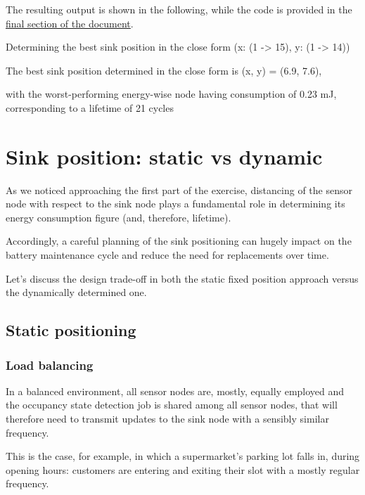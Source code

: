 \documentclass[a4paper,11pt]{article} %
\begin{document}
    The resulting output is shown in the following, while the code is provided in the \hyperref[subsec:lifetime-of-the-system-with-a-fixed-sink-position]{final section of the document}.

    \begin{tcolorbox}
        Determining the best sink position in the close form (x: (1 -> 15), y: (1 -> 14))

        \smallskip

        The best sink position determined in the close form is (x, y) = (6.9, 7.6),

        \smallskip

        with the worst-performing energy-wise node having consumption of 0.23 mJ, corresponding to a lifetime of 21 cycles
    \end{tcolorbox}


    \section{Sink position: static vs dynamic}\label{sec:sink-position:-static-vs-dynamic}

    As we noticed approaching the first part of the exercise, distancing of the sensor node with respect to the sink node plays a fundamental role in determining its energy consumption figure (and, therefore, lifetime).

    Accordingly, a careful planning of the sink positioning can hugely impact on the battery maintenance cycle and reduce the need for replacements over time.

    Let's discuss the design trade-off in both the static fixed position approach versus the dynamically determined one.

    \subsection{Static positioning}\label{subsec:static-positioning}

    \subsubsection{Load balancing}

    In a balanced environment, all sensor nodes are, mostly, equally employed and the occupancy state detection job is shared among all sensor nodes, that will therefore need to transmit updates to the sink node with a sensibly similar frequency.

    This is the case, for example, in which a supermarket's parking lot falls in, during opening hours: customers are entering and exiting their slot with a mostly regular frequency.
\end{document}
